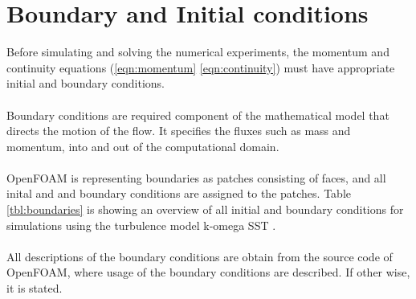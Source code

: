 \documentclass[a4paper, 12pt]{report}
\begin{document}
\section{Boundary and Initial conditions}
Before simulating and solving the numerical experiments, the momentum and continuity equations (\ref{eqn:momentum} \ref{eqn:continuity}) must have appropriate initial and boundary conditions.\\
\\
Boundary conditions are required component of the mathematical model that directs the motion of the flow. It specifies the fluxes such as mass and momentum, into and out of the computational domain.\\
\\
OpenFOAM is representing boundaries as patches consisting of faces, and all inital and and boundary conditions are assigned to the patches. Table \ref{tbl:boundaries} is showing an overview of all initial and boundary conditions for simulations using the turbulence model k-omega SST .\\
\\
All descriptions of the boundary conditions are obtain from the source code of OpenFOAM, where usage of the boundary conditions are described. If other wise, it is stated.
\end{document}
